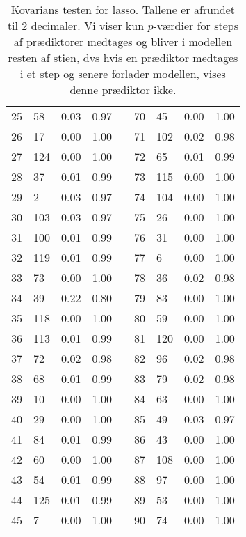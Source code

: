 \begin{table}[h]
{\begin{tabular}{lllllllll}
  25 & 58 & 0.03 & 0.97 & & 70 & 45 & 0.00 & 1.00 \\  
  26 & 17 & 0.00 & 1.00 & & 71 & 102 & 0.02 & 0.98 \\ 
  27 & 124 & 0.00 & 1.00 & & 72 & 65 & 0.01 & 0.99 \\ 
  28 & 37 & 0.01 & 0.99 & & 73 & 115 & 0.00 & 1.00 \\ 
  29 & 2 & 0.03 & 0.97 & & 74 & 104 & 0.00 & 1.00 \\ 
  30 & 103 & 0.03 & 0.97 & & 75 & 26 & 0.00 & 1.00 \\ 
  31 & 100 & 0.01 & 0.99 & & 76 & 31 & 0.00 & 1.00 \\ 
  32 & 119 & 0.01 & 0.99 & & 77 & 6 & 0.00 & 1.00 \\ 
  33 & 73 & 0.00 & 1.00 & & 78 & 36 & 0.02 & 0.98 \\ 
  34 & 39 & 0.22 & 0.80 & & 79 & 83 & 0.00 & 1.00 \\  
  35 & 118 & 0.00 & 1.00 & & 80 & 59 & 0.00 & 1.00 \\ 
  36 & 113 & 0.01 & 0.99 & & 81 & 120 & 0.00 & 1.00 \\
  37 & 72 & 0.02 & 0.98 & & 82 & 96 & 0.02 & 0.98 \\ 
  38 & 68 & 0.01 & 0.99 & & 83 & 79 & 0.02 & 0.98 \\
  39 & 10 & 0.00 & 1.00 & & 84 & 63 & 0.00 & 1.00 \\ 
  40 & 29 & 0.00 & 1.00 & & 85 & 49 & 0.03 & 0.97 \\ 
  41 & 84 & 0.01 & 0.99 & & 86 & 43 & 0.00 & 1.00 \\ 
  42 & 60 & 0.00 & 1.00 & & 87 & 108 & 0.00 & 1.00 \\ 
  43 & 54 & 0.01 & 0.99 & & 88 & 97 & 0.00 & 1.00 \\ 
  44 & 125 & 0.01 & 0.99 & & 89 & 53 & 0.00 & 1.00 \\ 
  45 & 7 & 0.00 & 1.00 & & 90 & 74 & 0.00 & 1.00 \\ 
\bottomrule
\end{tabular}
}
\caption{Kovarians testen for lasso.
Tallene er afrundet til 2 decimaler.
Vi viser kun \(p\)-værdier for steps af prædiktorer medtages og bliver i modellen resten af stien, dvs hvis en prædiktor medtages i et step og senere forlader modellen, vises denne prædiktor ikke.} \label{tab:covTest}

\end{table} 
